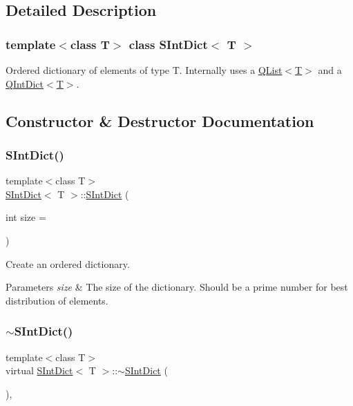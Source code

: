 \subsection{Detailed Description}
\subsubsection*{template$<$class T$>$\newline
class S\+Int\+Dict$<$ T $>$}

Ordered dictionary of elements of type T. Internally uses a \mbox{\hyperlink{class_q_list}{Q\+List$<$\+T$>$}} and a \mbox{\hyperlink{class_q_int_dict}{Q\+Int\+Dict$<$\+T$>$}}. 

\subsection{Constructor \& Destructor Documentation}
\mbox{\label{class_s_int_dict_a3285b0a5debceb2190c4f1cc8f8fd78b}} 
\subsubsection{\texorpdfstring{SIntDict()}{SIntDict()}}
{\footnotesize\ttfamily template$<$class T$>$ \\
\mbox{\hyperlink{class_s_int_dict}{S\+Int\+Dict}}$<$ T $>$\+::\mbox{\hyperlink{class_s_int_dict}{S\+Int\+Dict}} (\begin{DoxyParamCaption}\item[{int}]{size = {} }\end{DoxyParamCaption})\hspace{0.3cm}{\ttfamily [inline]}}

Create an ordered dictionary. 
\begin{DoxyParams}{Parameters}
{\em size} & The size of the dictionary. Should be a prime number for best distribution of elements. \\
\hline
\end{DoxyParams}
\mbox{\label{class_s_int_dict_a8d2e7da0367e653b432447a9dce7c604}} 
\subsubsection{\texorpdfstring{$\sim$SIntDict()}{~SIntDict()}}
{\footnotesize\ttfamily template$<$class T$>$ \\
virtual \mbox{\hyperlink{class_s_int_dict}{S\+Int\+Dict}}$<$ T $>$\+::$\sim$\mbox{\hyperlink{class_s_int_dict}{S\+Int\+Dict}} (\begin{DoxyParamCaption}{ }\end{DoxyParamCaption})\hspace{0.3cm}{\ttfamily [inline]}, {\ttfamily [virtual]}}

